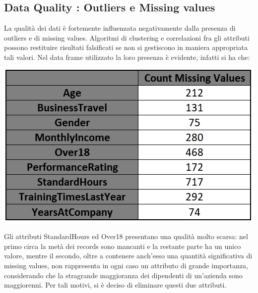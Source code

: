 \documentclass[a4paper,9pt]{article}
\begin{document}
\subsection{Data Quality : Outliers e Missing values}
La qualità dei dati è fortemente influenzata negativamente dalla presenza di outliers e di missing values. Algoritmi di clustering e correlazioni fra gli attributi possono restituire risultati falsificati se non si gestiscono in maniera appropriata tali valori. 
Nel data frame utilizzato la loro presenza è evidente, infatti si ha che:

\begin{center}
\includegraphics[scale=1.5]{missingvalues.png}
\end{center}
Gli attributi StandardHours ed Over18 presentano una qualità molto scarsa: nel primo circa la metà dei records sono mancanti e la restante parte ha un unico valore, mentre il secondo, oltre a contenere anch'esso una quantità significativa di missing values, non rappresenta in ogni caso un attributo di grande importanza, considerando che la stragrande maggioranza dei dipendenti di un'azienda sono maggiorenni. Per tali motivi, si è deciso di eliminare questi due attributi.
\end{document}
